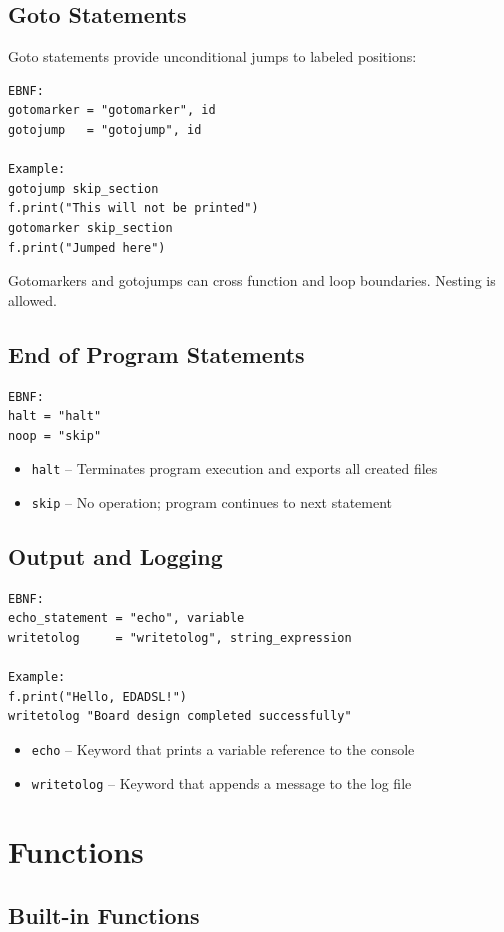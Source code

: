 \documentclass{report}
\begin{document}
\section{Goto Statements}
Goto statements provide unconditional jumps to labeled positions:
\begin{verbatim}
EBNF:
gotomarker = "gotomarker", id
gotojump   = "gotojump", id

Example:
gotojump skip_section
f.print("This will not be printed")
gotomarker skip_section
f.print("Jumped here")
\end{verbatim}
Gotomarkers and gotojumps can cross function and loop boundaries. Nesting is allowed.

\section{End of Program Statements}
\begin{verbatim}
EBNF:
halt = "halt"
noop = "skip"
\end{verbatim}
\begin{itemize}
\item \texttt{halt} -- Terminates program execution and exports all created files
\item \texttt{skip} -- No operation; program continues to next statement
\end{itemize}

\section{Output and Logging}
\begin{verbatim}
EBNF:
echo_statement = "echo", variable
writetolog     = "writetolog", string_expression

Example:
f.print("Hello, EDADSL!")
writetolog "Board design completed successfully"
\end{verbatim}
\begin{itemize}
\item \texttt{echo} -- Keyword that prints a variable reference to the console
\item \texttt{writetolog} -- Keyword that appends a message to the log file
\end{itemize}

\chapter{Functions}
\section{Built-in Functions}
\end{document}
